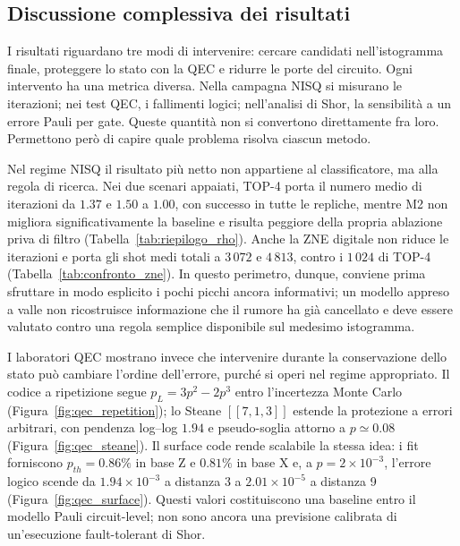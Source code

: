 \begin{onehalfspace}

\section{Discussione complessiva dei risultati}
\label{sec:discussione_complessiva}

I risultati riguardano tre modi di intervenire: cercare candidati nell'istogramma finale, proteggere lo stato con la QEC e ridurre le porte del circuito. Ogni intervento ha una metrica diversa. Nella campagna NISQ si misurano le iterazioni; nei test QEC, i fallimenti logici; nell'analisi di Shor, la sensibilità a un errore Pauli per gate. Queste quantità non si convertono direttamente fra loro. Permettono però di capire quale problema risolva ciascun metodo.

Nel regime NISQ il risultato più netto non appartiene al classificatore, ma alla regola di
ricerca. Nei due scenari appaiati, TOP-4 porta il numero medio di iterazioni da $1.37$ e
$1.50$ a $1.00$, con successo in tutte le repliche, mentre M2 non migliora significativamente
la baseline e risulta peggiore della propria ablazione priva di filtro
(Tabella~\ref{tab:riepilogo_rho}). Anche la ZNE digitale non riduce le iterazioni e porta gli
shot medi totali a $3\,072$ e $4\,813$, contro i $1\,024$ di TOP-4
(Tabella~\ref{tab:confronto_zne}). In questo perimetro, dunque, conviene prima sfruttare in
modo esplicito i pochi picchi ancora informativi; un modello appreso a valle non ricostruisce
informazione che il rumore ha già cancellato e deve essere valutato contro una regola semplice
disponibile sul medesimo istogramma.

I laboratori QEC mostrano invece che intervenire durante la conservazione dello stato può
cambiare l'ordine dell'errore, purché si operi nel regime appropriato. Il codice a ripetizione
segue $p_L=3p^2-2p^3$ entro l'incertezza Monte Carlo
(Figura~\ref{fig:qec_repetition}); lo Steane $[[7,1,3]]$ estende la protezione a errori
arbitrari, con pendenza log--log $1.94$ e pseudo-soglia attorno a $p\simeq0.08$
(Figura~\ref{fig:qec_steane}). Il surface code rende scalabile la stessa idea: i fit forniscono
$p_{th}=0.86\%$ in base Z e $0.81\%$ in base X e, a $p=2\times10^{-3}$, l'errore logico
scende da $1.94\times10^{-3}$ a distanza 3 a $2.01\times10^{-5}$ a distanza 9
(Figura~\ref{fig:qec_surface}). Questi valori costituiscono una baseline entro il modello
Pauli circuit-level; non sono ancora una previsione calibrata di un'esecuzione
fault-tolerant di Shor.


\end{onehalfspace}

